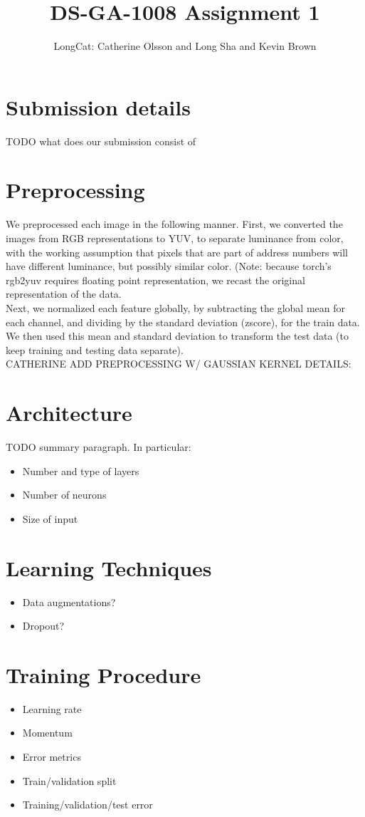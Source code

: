 \documentclass{article}
\title{DS-GA-1008 Assignment 1}
\author{LongCat: Catherine Olsson and Long Sha and Kevin Brown}
\begin{document}
\maketitle


\section{Submission details}

TODO what does our submission consist of

\section{Preprocessing}

We preprocessed each image in the following manner. First, we converted the
images from RGB representations to YUV, to separate luminance from color, with
the working assumption that pixels that are part of address numbers will have
different luminance, but possibly similar color. (Note: because torch's rgb2yuv
requires floating point representation, we recast the original representation of
the data. \\

Next, we normalized each feature globally, by subtracting the global mean for
each channel, and dividing by the standard deviation (zscore), for the train
data. We then used this mean and standard deviation to transform the test data
(to keep training and testing data separate). \\

CATHERINE ADD PREPROCESSING W/ GAUSSIAN KERNEL DETAILS:\\


\section{Architecture}

TODO summary paragraph. In particular:
\begin{itemize}
\item Number and type of layers
\item Number of neurons
\item Size of input
\end{itemize}

\section{Learning Techniques}
\begin{itemize}
\item Data augmentations?
\item Dropout?
\end{itemize}

\section{Training Procedure}
\begin{itemize}
\item Learning rate
\item Momentum
\item Error metrics
\item Train/validation split
\item Training/validation/test error
\end{itemize}
\end{document}
